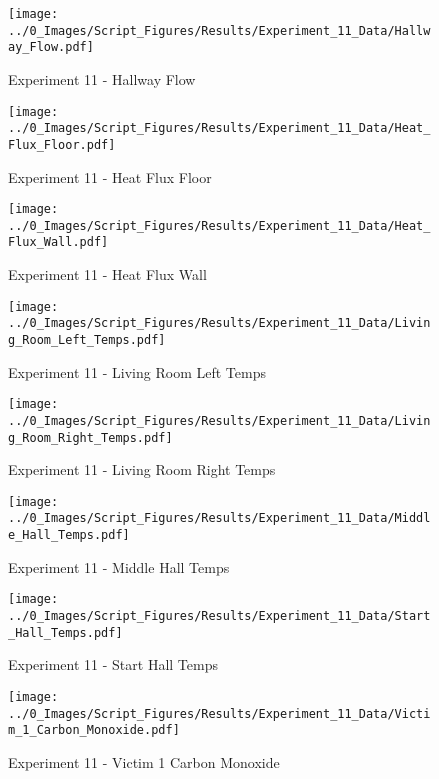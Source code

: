 	\begin{figure}[H]
		\centering
		\texttt{[image: ../0\_Images/Script\_Figures/Results/Experiment\_11\_Data/Hallway\_Flow.pdf]}
		\caption[]{Experiment 11 - Hallway Flow}
	\end{figure}
 
	\clearpage

	\begin{figure}[H]
		\centering
		\texttt{[image: ../0\_Images/Script\_Figures/Results/Experiment\_11\_Data/Heat\_Flux\_Floor.pdf]}
		\caption[]{Experiment 11 - Heat Flux Floor}
	\end{figure}
 

	\begin{figure}[H]
		\centering
		\texttt{[image: ../0\_Images/Script\_Figures/Results/Experiment\_11\_Data/Heat\_Flux\_Wall.pdf]}
		\caption[]{Experiment 11 - Heat Flux Wall}
	\end{figure}
 
	\clearpage

	\begin{figure}[H]
		\centering
		\texttt{[image: ../0\_Images/Script\_Figures/Results/Experiment\_11\_Data/Living\_Room\_Left\_Temps.pdf]}
		\caption[]{Experiment 11 - Living Room Left Temps}
	\end{figure}
 

	\begin{figure}[H]
		\centering
		\texttt{[image: ../0\_Images/Script\_Figures/Results/Experiment\_11\_Data/Living\_Room\_Right\_Temps.pdf]}
		\caption[]{Experiment 11 - Living Room Right Temps}
	\end{figure}
 
	\clearpage

	\begin{figure}[H]
		\centering
		\texttt{[image: ../0\_Images/Script\_Figures/Results/Experiment\_11\_Data/Middle\_Hall\_Temps.pdf]}
		\caption[]{Experiment 11 - Middle Hall Temps}
	\end{figure}
 

	\begin{figure}[H]
		\centering
		\texttt{[image: ../0\_Images/Script\_Figures/Results/Experiment\_11\_Data/Start\_Hall\_Temps.pdf]}
		\caption[]{Experiment 11 - Start Hall Temps}
	\end{figure}
 
	\clearpage

	\begin{figure}[H]
		\centering
		\texttt{[image: ../0\_Images/Script\_Figures/Results/Experiment\_11\_Data/Victim\_1\_Carbon\_Monoxide.pdf]}
		\caption[]{Experiment 11 - Victim 1 Carbon Monoxide}
	\end{figure}
 

